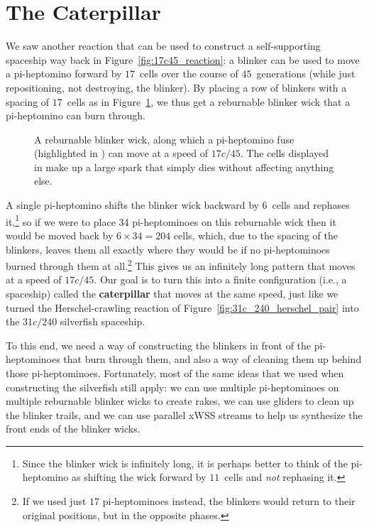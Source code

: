 \section{The Caterpillar}\label{sec:caterpillar}

We saw another reaction that can be used to construct a self-supporting spaceship way back in Figure~\ref{fig:17c45_reaction}: a blinker can be used to move a pi-heptomino forward by $17$~cells over the course of $45$~generations (while just repositioning, not destroying, the blinker). By placing a row of blinkers with a spacing of $17$~cells as in Figure~\ref{fig:reburnable_blinker_wick}, we thus get a reburnable blinker wick that a pi-heptomino can burn through.

\begin{figure}[!htb]
	\centering
	\caption{A reburnable blinker wick, along which a pi-heptomino fuse (highlighted in ) can move at a speed of $17c/45$. The cells displayed in  make up a large spark that simply dies without affecting anything else.}\label{fig:reburnable_blinker_wick}
\end{figure}

A single pi-heptomino shifts the blinker wick backward by $6$~cells and rephases it,\footnote{Since the blinker wick is infinitely long, it is perhaps better to think of the pi-heptomino as shifting the wick forward by $11$~cells and \emph{not} rephasing it.} so if we were to place 34 pi-heptominoes on this reburnable wick then it would be moved back by $6 \times 34 = 204$ cells, which, due to the spacing of the blinkers, leaves them all exactly where they would be if no pi-heptominoes burned through them at all.\footnote{If we used just $17$ pi-heptominoes instead, the blinkers would return to their original positions, but in the opposite phases.} This gives us an infinitely long pattern that moves at a speed of $17c/45$. Our goal is to turn this into a finite configuration (i.e., a spaceship) called the \textbf{caterpillar} that moves at the same speed, just like we turned the Herschel-crawling reaction of Figure~\ref{fig:31c_240_herschel_pair} into the $31c/240$ silverfish spaceship.

To this end, we need a way of constructing the blinkers in front of the pi-heptominoes that burn through them, and also a way of cleaning them up behind those pi-heptominoes. Fortunately, most of the same ideas that we used when constructing the silverfish still apply: we can use multiple pi-heptominoes on multiple reburnable blinker wicks to create rakes, we can use gliders to clean up the blinker trails, and we can use parallel xWSS streams to help us synthesize the front ends of the blinker wicks.

